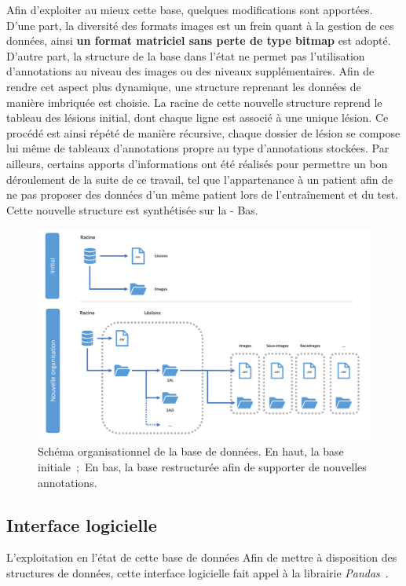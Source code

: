 Afin d'exploiter au mieux cette base, quelques modifications sont apportées. D'une part, la diversité des formats images est un frein quant à la gestion de ces données, ainsi \textbf{un format matriciel sans perte de type bitmap} est adopté. D'autre part, la structure de la base dans l'état ne permet pas l'utilisation d'annotations au niveau des images ou des niveaux supplémentaires. Afin de rendre cet aspect plus dynamique, une structure reprenant les données de manière imbriquée est choisie. La racine de cette nouvelle structure reprend le tableau des lésions initial, dont chaque ligne est associé à une unique lésion. Ce procédé est ainsi répété de manière récursive, chaque dossier de lésion se compose lui même de tableaux d'annotations propre au type d'annotations stockées. Par ailleurs, certains apports d'informations ont été réalisés pour permettre un bon déroulement de la suite de ce travail, tel que l'appartenance à un patient afin de ne pas proposer des données d'un même patient lors de l'entraînement et du test. Cette nouvelle structure est synthétisée sur la  - Bas.\par

\begin{figure}[H]
    \centering
    \includegraphics[width=0.9\linewidth]{contents/chapter_4/resources/scheme_data_structure.pdf}
    \caption{Schéma organisationnel de la base de données. En haut, la base initiale~;~En bas, la base restructurée afin de supporter de nouvelles annotations.}
    \label{fig:db_structure}
\end{figure}\par
\clearpage

\subsection{Interface logicielle}
\label{sec:dataset_api}
L'exploitation en l'état de cette base de données
Afin de mettre à disposition des structures de données, cette interface logicielle fait appel à la librairie \textit{Pandas}~\cite{Pandas2020}.\par 

